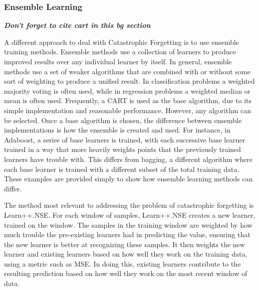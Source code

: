 	\subsubsection{Ensemble Learning}\label{bg:advanced_ensemble}
	\textbf{\textit{Don't forget to cite cart in this bg section \cite{cartIntro}}}
	\par A different approach to deal with Catastrophic Forgetting is to use ensemble training methods. Ensemble methods use a collection of learners to produce improved results over any individual learner by itself. In general, ensemble methods use a set of weaker algorithms that are combined with or without some sort of weighting to produce a unified result. In classification problems a weighted majority voting is often used, while in regression problems a weighted median or mean is often used. Frequently, a CART is used as the base algorithm, due to its simple implementation and reasonable performance. However, any algorithm can be selected. Once a base algorithm is chosen, the difference between ensemble implementations is how the ensemble is created and used. For instance, in Adaboost, a series of base learners is trained, with each successive base learner trained in a way that more heavily weights points that the previously trained learners have trouble with. This differs from bagging, a different algorithm where each base learner is trained with a different subset of the total training data. These examples are provided simply to show how ensemble learning methods can differ.
	\par The method most relevant to addressing the problem of catastrophic forgetting is Learn++.NSE. For each window of samples, Learn++.NSE creates a new learner, trained on the window. The samples in the training window are weighted by how much trouble the pre-existing learners had in predicting the value, ensuring that the new learner is better at recognizing these samples. It then weights the new learner and existing learners based on how well they work on the training data, using a metric such as MSE. In doing this, existing learners contribute to the resulting prediction based on how well they work on the most recent window of data. 
